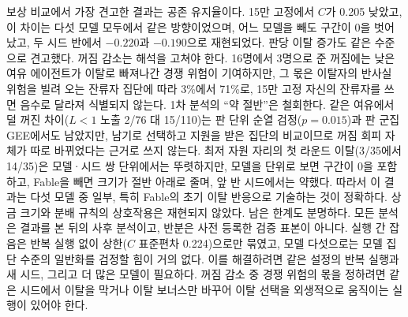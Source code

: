 보상 비교에서 가장 견고한 결과는 공존 유지율이다. 15만 고정에서 $C$가 0.205 낮았고, 이 차이는 다섯 모델 모두에서 같은 방향이었으며, 어느 모델을 빼도 구간이 0을 벗어났고, 두 시드 반에서 $-0.220$과 $-0.190$으로 재현되었다. 판당 이탈 증가도 같은 수준으로 견고했다. 꺼짐 감소는 해석을 고쳐야 한다. 16명에서 3명으로 준 꺼짐에는 낮은 여유 에이전트가 이탈로 빠져나간 경쟁 위험이 기여하지만, 그 몫은 이탈자의 반사실 위험을 빌려 오는 잔류자 집단에 따라 3\%에서 71\%로, 15만 고정 자신의 잔류자를 쓰면 음수로 달라져 식별되지 않는다. 1차 분석의 ``약 절반''은 철회한다. 같은 여유에서 덜 꺼진 차이($L<1$ 노출 2/76 대 15/110)는 판 단위 순열 검정($p=0.015$)과 판 군집 GEE에서도 남았지만, 남기로 선택하고 지원을 받은 집단의 비교이므로 꺼짐 회피 자체가 따로 바뀌었다는 근거로 쓰지 않는다. 최저 자원 자리의 첫 라운드 이탈(3/35에서 14/35)은 모델·시드 쌍 단위에서는 뚜렷하지만, 모델을 단위로 보면 구간이 0을 포함하고, Fable을 빼면 크기가 절반 아래로 줄며, 앞 반 시드에서는 약했다. 따라서 이 결과는 다섯 모델 중 일부, 특히 Fable의 초기 이탈 반응으로 기술하는 것이 정확하다. 상금 크기와 분배 규칙의 상호작용은 재현되지 않았다. 남은 한계도 분명하다. 모든 분석은 결과를 본 뒤의 사후 분석이고, 반분은 사전 등록한 검증 표본이 아니다. 실행 간 잡음은 반복 실행 없이 상한($C$ 표준편차 0.224)으로만 묶였고, 모델 다섯으로는 모델 집단 수준의 일반화를 검정할 힘이 거의 없다. 이를 해결하려면 같은 설정의 반복 실행과 새 시드, 그리고 더 많은 모델이 필요하다. 꺼짐 감소 중 경쟁 위험의 몫을 정하려면 같은 시드에서 이탈을 막거나 이탈 보너스만 바꾸어 이탈 선택을 외생적으로 움직이는 실행이 있어야 한다.
